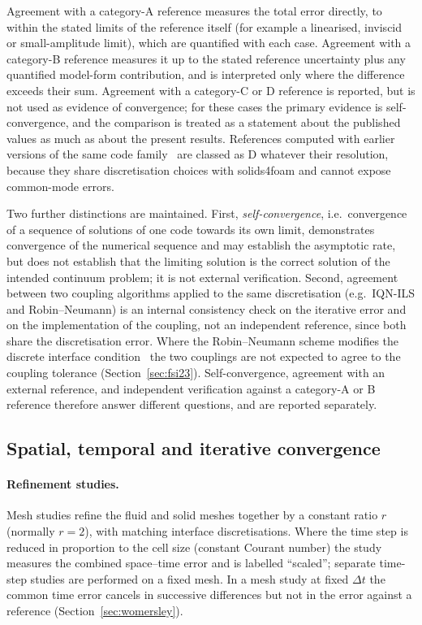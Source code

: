 Agreement with a category-A reference measures the total error directly, to within the stated limits of the reference itself (for example a linearised, inviscid or small-amplitude limit), which are quantified with each case.
Agreement with a category-B reference measures it up to the stated reference uncertainty plus any quantified model-form contribution, and is interpreted only where the difference exceeds their sum.
Agreement with a category-C or D reference is reported, but is not used as evidence of convergence; for these cases the primary evidence is self-convergence, and the comparison is treated as a statement about the published values as much as about the present results.
References computed with earlier versions of the same code family~\citep{Tukovic2018} are classed as D whatever their resolution, because they share discretisation choices with solids4foam and cannot expose common-mode errors.

Two further distinctions are maintained.
First, \emph{self-convergence}, i.e.\ convergence of a sequence of solutions of one code towards its own limit, demonstrates convergence of the numerical sequence and may establish the asymptotic rate, but does not establish that the limiting solution is the correct solution of the intended continuum problem; it is not external verification.
Second, agreement between two coupling algorithms applied to the same discretisation (e.g.\ IQN-ILS and Robin--Neumann) is an internal consistency check on the iterative error and on the implementation of the coupling, not an independent reference, since both share the discretisation error.
Where the Robin--Neumann scheme modifies the discrete interface condition~\citep{Tukovic2018b} the two couplings are not expected to agree to the coupling tolerance (Section~\ref{sec:fsi23}).
Self-convergence, agreement with an external reference, and independent verification against a category-A or B reference therefore answer different questions, and are reported separately.

\subsection{Spatial, temporal and iterative convergence}\label{sec:convergence_method}

\paragraph{Refinement studies.}
Mesh studies refine the fluid and solid meshes together by a constant ratio $r$ (normally $r=2$), with matching interface discretisations.
Where the time step is reduced in proportion to the cell size (constant Courant number) the study measures the combined space--time error and is labelled ``scaled''; separate time-step studies are performed on a fixed mesh.
In a mesh study at fixed $\Delta t$ the common time error cancels in successive differences but not in the error against a reference (Section~\ref{sec:womersley}).

